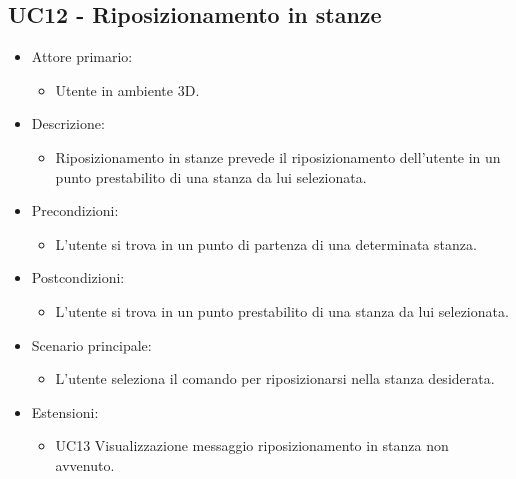 \subsection{UC12 - Riposizionamento in stanze}
\begin{itemize}

	\item Attore primario: 
	\begin{itemize}
		\item Utente in ambiente 3D.
	\end{itemize}
	\item Descrizione:
	\begin{itemize}
		\item Riposizionamento in stanze prevede il riposizionamento dell'utente in un punto prestabilito di una stanza da lui selezionata.
	\end{itemize}
	
	\item Precondizioni:
	\begin{itemize}
		\item L'utente si trova in un punto di partenza di una determinata stanza.
	\end{itemize}
	
	\item Postcondizioni:
	\begin{itemize}
		\item L'utente si trova in un punto prestabilito di una stanza da lui selezionata.
	\end{itemize}
	
	\item Scenario principale:
	\begin{itemize}
		\item L'utente seleziona il comando per riposizionarsi nella stanza desiderata.
	\end{itemize}

	\item Estensioni:
	\begin{itemize}
		\item UC13 Visualizzazione messaggio riposizionamento in stanza non avvenuto.
	\end{itemize}
	
\end{itemize}

\pagebreak

